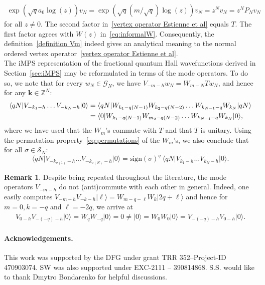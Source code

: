 \documentclass[letterpaper, DIV=17]{scrartcl}
\numberwithin{equation}{section}
\theoremstyle{definition}
\newtheorem{rem}[theorem]{Remark}
\begin{document}
	\begin{align*}
		\exp(\sqrt{q} a_0 \log(z)) v_N = \exp(\sqrt{q} (m/\sqrt{q}) \log(z)) v_N = z^N v_N
		= z^N P_N v_N
	\end{align*}
	for all $z\neq 0$. 
	The second factor in~\eqref{vertex operator Estienne et al} equals $ T $. The first factor agrees with $W(z) $ in~\eqref{eq:informalW}. Consequently, the definition~\eqref{definition Vm} indeed gives an analytical meaning to 
	the normal ordered vertex operator~\eqref{vertex operator Estienne et al}. \\

The iMPS representation of the fractional quantum Hall wavefunctions derived in Section~\ref{sec:iMPS} may be reformulated in terms of the mode operators. To do so, we note that for every $w_N\in \mathcal{G}_N$, we have
	$
		V_{-m-h} w_N = W_{m-N} T w_N $, and hence for any $ \mathbf{k} \in \mathbb{Z}^N $: 
\begin{align}
	\langle qN \vert V_{-k_1-h} \dots V_{-k_N-h} \vert 0 \rangle 
	&= \langle qN \vert W_{k_1-q(N-1)} W_{k_2-q(N-2)} \dots W_{k_{N-1}-q} W_{k_N} \vert qN \rangle \notag \\
	&= \langle 0 \vert W_{k_1-q(N-1)} W_{m_2-q(N-2)} \dots W_{k_{N-1}-q} W_{k_N} \vert 0 \rangle,
\end{align}
where we have used that the $W_m$'s commute with $T$ and that $T$ is unitary.  
Using the permutation property~\eqref{eq:permutations}  of the $ W_m $'s, we also conclude
that for all $ \sigma \in \mathcal{S}_N $:
\begin{equation} \label{permutation V}
	\langle qN \vert V_{-k_{\sigma(1)}-h} \dots V_{-k_{\sigma(N)}-h} \vert 0 \rangle
	= \mathrm{sign}(\sigma)^q  \ \langle qN \vert V_{k_1-h} \dots V_{k_N-h} \vert 0 \rangle . 
\end{equation}



\begin{rem} Despite being repeated throughout the literature,  the mode operators $V_{-m-h}$ do not (anti)commute with each other in general. Indeed, one easily computes 
$
	V_{-m-h} V_{-k-h} \vert \ell \rangle = W_{m-q-\ell} W_k \vert 2q + \ell \rangle $ 
and hence for $m=0, k=-q$ and $\ell=-2q$, we arrive at
\begin{align*}
	V_{0-h} V_{-(-q)-h} \vert 0 \rangle = W_q W_{-q} \vert 0 \rangle = 0 \neq \vert 0 \rangle = W_0 W_0 \vert 0 \rangle = V_{-(-q)-h} V_{0-h} \vert 0 \rangle.
\end{align*}
\end{rem}

		
\paragraph{Acknowledgements.} This work was supported by the DFG under grant TRR 352--Project-ID 470903074. SW was also supported under EXC-2111 -- 390814868.  S.S. would like to thank Dmytro Bondarenko for helpful discussions.



		
		
		

	
\end{document}
